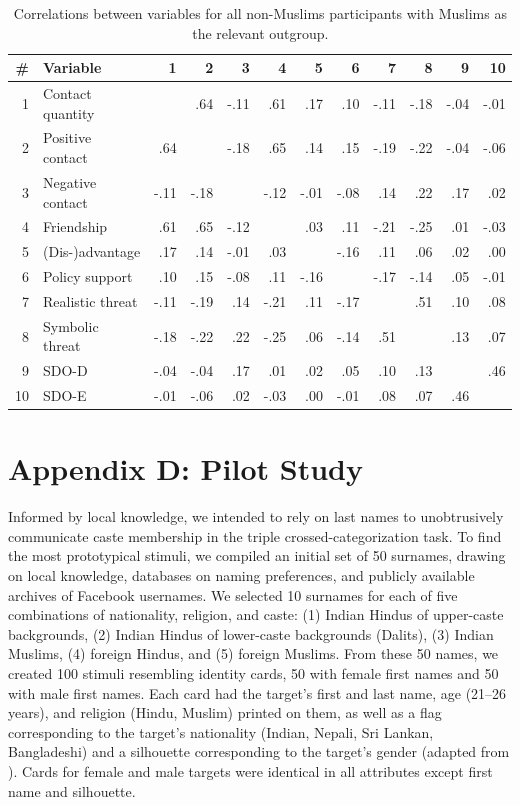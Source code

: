 \documentclass[12pt, a4paper]{article}
\begin{document}
\begin{table}[!hp]
\centering
{}
\caption{Correlations between variables for all non-Muslims participants with Muslims as the relevant outgroup.}
\small	
\begin{tabularx}{\linewidth}{r@{~~}X@{~~}rrrrrrrrrr} \toprule
\# & Variable & 1 & 2 & 3 & 4 & 5 & 6 & 7 & 8 & 9 & 10 \\ \midrule 
1 & Contact quantity &  &  .64 & -.11 &  .61 &  .17 &  .10 & -.11 & -.18 & -.04 & -.01 \\ 
  2 & Positive contact &  .64 &  & -.18 &  .65 &  .14 &  .15 & -.19 & -.22 & -.04 & -.06 \\ 
  3 & Negative contact & -.11 & -.18 &  & -.12 & -.01 & -.08 &  .14 &  .22 &  .17 &  .02 \\ 
  4 & Friendship &  .61 &  .65 & -.12 &  &  .03 &  .11 & -.21 & -.25 &  .01 & -.03 \\ 
  5 & (Dis-)advantage &  .17 &  .14 & -.01 &  .03 &  & -.16 &  .11 &  .06 &  .02 &  .00 \\ 
  6 & Policy support &  .10 &  .15 & -.08 &  .11 & -.16 &  & -.17 & -.14 &  .05 & -.01 \\ 
  7 & Realistic threat & -.11 & -.19 &  .14 & -.21 &  .11 & -.17 &  &  .51 &  .10 &  .08 \\ 
  8 & Symbolic threat & -.18 & -.22 &  .22 & -.25 &  .06 & -.14 &  .51 &  &  .13 &  .07 \\ 
  9 & SDO-D & -.04 & -.04 &  .17 &  .01 &  .02 &  .05 &  .10 &  .13 &  &  .46 \\ 
  10 & SDO-E & -.01 & -.06 &  .02 & -.03 &  .00 & -.01 &  .08 &  .07 &  .46 &  \\ 
\bottomrule
\end{tabularx}
\label{tab:c-5}
\end{table}

\newpage

\section{Appendix D: Pilot Study}

Informed by local knowledge, we intended to rely on last names to unobtrusively communicate caste membership in the triple crossed-categorization task. To find the most prototypical stimuli, we compiled an initial set of 50 surnames, drawing on local knowledge, databases on naming preferences, and publicly available archives of Facebook usernames. We selected 10 surnames for each of five combinations of nationality, religion, and caste: (1) Indian Hindus of upper-caste backgrounds, (2) Indian Hindus of lower-caste backgrounds (Dalits), (3) Indian Muslims, (4) foreign Hindus, and (5) foreign Muslims. From these 50 names, we created 100 stimuli resembling identity cards, 50 with female first names and 50 with male first names. Each card had the target's first and last name, age (21--26 years), and religion (Hindu, Muslim) printed on them, as well as a flag corresponding to the target's nationality (Indian, Nepali, Sri Lankan, Bangladeshi) and a silhouette corresponding to the target's gender (adapted from ). Cards for female and male targets were identical in all attributes except first name and silhouette.
\end{document}
